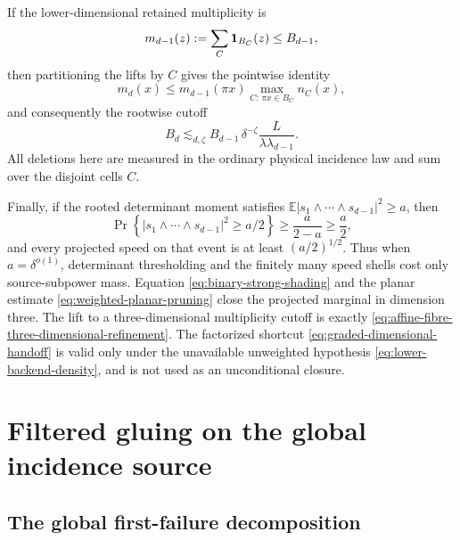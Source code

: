 \documentclass[11pt]{article}
\begin{document}
If the lower-dimensional retained multiplicity is
\[
 m_{d-1}(z):=\sum_C{\bf1}_{B_C}(z)\le B_{d-1},
\]
then partitioning the lifts by \(C\) gives the pointwise identity
\begin{equation}\label{eq:base-fibre-multiplicity}
 m_d(x)
 \le m_{d-1}(\pi x)
 \max_{C:\,\pi x\in B_C}n_C(x),
\end{equation}
and consequently the rootwise cutoff
\begin{equation}\label{eq:graded-dimensional-handoff}
 \boxed{
 B_d\lesssim_{d,\zeta}
 B_{d-1}\,
 \delta^{-\zeta}\frac{L}{\lambda\lambda_{d-1}}.}
\end{equation}
All deletions here are measured in the ordinary physical incidence law and
sum over the disjoint cells \(C\).

Finally, if the rooted determinant moment satisfies
\(\mathbb E|s_1\wedge\cdots\wedge s_{d-1}|^2\ge a\), then
\begin{equation}\label{eq:determinant-speed-regularization}
 \Pr\left\{|s_1\wedge\cdots\wedge s_{d-1}|^2\ge a/2\right\}
 \ge\frac{a}{2-a}\ge\frac a2,
\end{equation}
and every projected speed on that event is at least \((a/2)^{1/2}\).
Thus when \(a=\delta^{o(1)}\), determinant thresholding and the finitely many
speed shells cost only source-subpower mass.  Equation
\eqref{eq:binary-strong-shading} and the planar estimate
\eqref{eq:weighted-planar-pruning} close the projected marginal in dimension
three.  The lift to a three-dimensional multiplicity cutoff is exactly
\eqref{eq:affine-fibre-three-dimensional-refinement}.  The factorized shortcut
\eqref{eq:graded-dimensional-handoff} is valid only under the unavailable
unweighted hypothesis \eqref{eq:lower-backend-density}, and is not used as an
unconditional closure.

\section{Filtered gluing on the global incidence source}

\subsection{The global first-failure decomposition}
\end{document}
